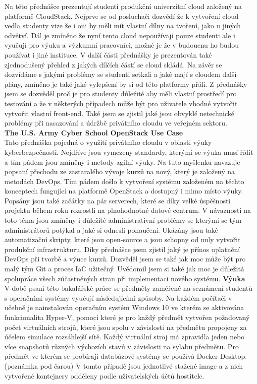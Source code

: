 \documentclass[twoside, 12pt]{article}
\begin{document}
Na této přednášce prezentují studenti produkční univerzitní cloud založený na platformě CloudStack. Nejprve se od posluchači dozvědí že k vytvoření cloud vedla studenty vize že i oni by měli mít vlastní dílny na tvoření, jako u jiných odvětví. Dál je zmíněno že nyní tento cloud nepoužívají pouze studenti ale i vyučují pro výuku a výzkumní pracovníci, možné je že v budoucnu ho budou používat i jiné instituce. V další části přednášky je prezentován také zjednodušený přehled z jakých dílčích částí se cloud skládá. Na závěr se dozvídáme s jakými problémy se studenti setkali a jaké mají s cloudem další plány, zmíněno je také jaké vylepšení by si od této platformy přáli. \cite{cloudstackcon} Z přednášky jsem se dozvěděl proč je pro studenty důležité aby měli vlastní prostředí pro testování a že v některých případech může být pro uživatele vhodné vytvořit vytvořit vlastní front-end. Také jsem se zjistil jaké jsou obvyklé netechnické problémy při nasazování a údržbě privátního cloudu ve veřejném sektoru.\\
\textbf{The U.S. Army Cyber School OpenStack Use Case}\\
Tato přednáška pojedná o využití privátního cloudu v oblasti výuky kyberbezpečnosti. Nejdříve jsou vymezeny standardy, kterými se výuka musí řídit a tím pádem jsou zmíněny i metody agilní výuky. Na tuto myšlenku navazuje popsaní přechodu ze zastaralého vývoje kurzů na nový, který je založený na metodách DevOps. Tím pádem došlo k vytvoření systému založeném na těchto konceptech fungující na platformě OpenStack a dostupný i mimo místo výuky. Popsány jsou také začátky na pár serverech, které se díky velké úspěšnosti projektu během roku rozrostli na plnohodnotné datové centrum. V návaznosti na toto téma jsou zmíněny i důležité administrativní problémy se kterými se tým administrátorů potýkal a jaké si odnesli ponaučení. Ukázány jsou také automatizační skripty, které jsou open-source a jsou schopny od nuly vytvořit produkční infrastrukturu. \cite{usarmy} Díky přednášce jsem zjistil jaký je přínos uplatnění DevOps při tvorbě a výuce kurzů. Dozvěděl jsem se také jak moc může být pro malý tým Git a proces IaC užitečný. Uvědomil jsem si také jak moc je důležitá spolupráce všech zúčastněných stran při implementaci nového systému. 
\textbf{Výuka}\\
V době psaní této bakalářské práce se předměty zaměřené na seznámení studentů s operačními systémy vyučují následujícími způsoby. Na každém počítači v učebně je nainstalován operačním systém Windows 10 ve kterém se aktivována funkcionalita Hyper-V, pomocí které je pro každý předmět vytvořen požadovaný počet virtuálních strojů, které jsou spolu v závislosti na předmětu propojeny za účelem simulace rozsáhlejší sítě. Každý virtuální stroj má zpravidla jeden nebo více snapshotů různých výchozích stavů v závislosti na sylabu předmětu. Pro předmět ve kterém se probírají databázové systémy se používá Docker Desktop. (poznámka pod čarou) V tomto případě jsou jednotlivé stažené image a z nich vytvořené kontejnery odděleny podle uživatelských účtů hostitele.
\end{document}
